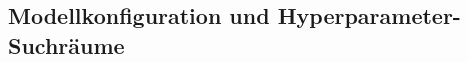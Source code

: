 \documentclass[12pt,a4paper]{article}
\begin{document}
%
%

\subsection{Modellkonfiguration und Hyperparameter-Suchräume}
\end{document}
